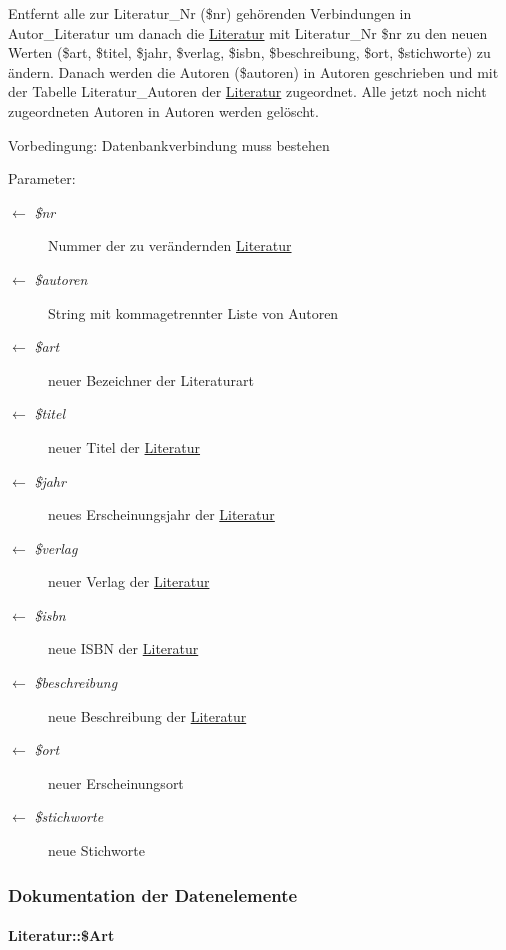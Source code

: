 Entfernt alle zur Literatur\_\-Nr (\$nr) gehörenden Verbindungen in Autor\_\-Literatur um danach die \hyperlink{classLiteratur}{Literatur} mit Literatur\_\-Nr \$nr zu den neuen Werten (\$art, \$titel, \$jahr, \$verlag, \$isbn, \$beschreibung, \$ort, \$stichworte) zu ändern. Danach werden die Autoren (\$autoren) in Autoren geschrieben und mit der Tabelle Literatur\_\-Autoren der \hyperlink{classLiteratur}{Literatur} zugeordnet. Alle jetzt noch nicht zugeordneten Autoren in Autoren werden gelöscht. \begin{Desc}
\item[Vorbedingung:]Datenbankverbindung muss bestehen \end{Desc}
\begin{Desc}
\item[Parameter:]
\begin{description}
\item[\mbox{$\leftarrow$} {\em \$nr}]Nummer der zu verändernden \hyperlink{classLiteratur}{Literatur} \item[\mbox{$\leftarrow$} {\em \$autoren}]String mit kommagetrennter Liste von Autoren \item[\mbox{$\leftarrow$} {\em \$art}]neuer Bezeichner der Literaturart \item[\mbox{$\leftarrow$} {\em \$titel}]neuer Titel der \hyperlink{classLiteratur}{Literatur} \item[\mbox{$\leftarrow$} {\em \$jahr}]neues Erscheinungsjahr der \hyperlink{classLiteratur}{Literatur} \item[\mbox{$\leftarrow$} {\em \$verlag}]neuer Verlag der \hyperlink{classLiteratur}{Literatur} \item[\mbox{$\leftarrow$} {\em \$isbn}]neue ISBN der \hyperlink{classLiteratur}{Literatur} \item[\mbox{$\leftarrow$} {\em \$beschreibung}]neue Beschreibung der \hyperlink{classLiteratur}{Literatur} \item[\mbox{$\leftarrow$} {\em \$ort}]neuer Erscheinungsort \item[\mbox{$\leftarrow$} {\em \$stichworte}]neue Stichworte \end{description}
\end{Desc}


\subsubsection{Dokumentation der Datenelemente}
\hypertarget{classLiteratur_fb4d4b1ce29a33a10e3e27d47f31a447}{
\paragraph[\$Art]{\setlength{\rightskip}{0pt plus 5cm}Literatur::\$Art}\hfill}
\label{classLiteratur_fb4d4b1ce29a33a10e3e27d47f31a447}


